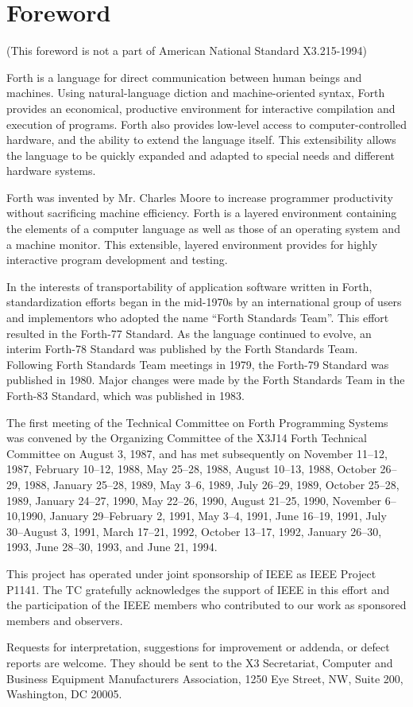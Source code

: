 \chapter*{Foreword }

(This foreword is not a part of American National Standard X3.215-1994)

Forth is a language for direct communication between human beings and
machines. Using natural-language diction and machine-oriented syntax,
Forth provides an economical, productive environment for interactive
compilation and execution of programs. Forth also provides low-level
access to computer-controlled hardware, and the ability to extend the
language itself. This extensibility allows the language to be quickly
expanded and adapted to special needs and different hardware systems.

Forth was invented by Mr. Charles Moore to increase programmer productivity
without sacrificing machine efficiency. Forth is a layered environment
containing the elements of a computer language as well as those of an
operating system and a machine monitor. This extensible, layered environment
provides for highly interactive program development and testing.

In the interests of transportability of application software written in
Forth, standardization efforts began in the mid-1970s by an international
group of users and implementors who adopted the name ``Forth Standards Team''.
This effort resulted in the Forth-77 Standard. As the language continued
to evolve, an interim Forth-78 Standard was published by the Forth Standards
Team. Following Forth Standards Team meetings in 1979, the Forth-79 Standard
was published in 1980. Major changes were made by the Forth Standards Team
in the Forth-83 Standard, which was published in 1983.

The first meeting of the Technical Committee on Forth Programming Systems
was convened by the Organizing Committee of the X3J14 Forth Technical Committee on
August 3, 1987, and has met subsequently on
November 11--12, 1987,
February 10--12, 1988,
May 25--28, 1988,
August 10--13, 1988,
October 26--29, 1988,
January 25--28, 1989,
May 3--6, 1989,
July 26--29, 1989,
October 25--28, 1989,
January 24--27, 1990,
May 22--26, 1990,
August 21--25, 1990,
November 6--10,1990,
January 29--February 2,
1991, May 3--4, 1991,
June 16--19, 1991,
July 30--August 3, 1991,
March 17--21, 1992,
October 13--17, 1992,
January 26--30, 1993,
June 28--30, 1993,
and
June 21, 1994.

This project has operated under joint sponsorship of IEEE as IEEE Project P1141.
The TC gratefully acknowledges the support of IEEE in this effort and the
participation of the IEEE members who contributed to our work as sponsored
members and observers.

Requests for interpretation, suggestions for improvement or addenda, or defect
reports are welcome. They should be sent to the X3 Secretariat, Computer and
Business Equipment Manufacturers Association, 1250 Eye Street, NW, Suite 200,
Washington, DC 20005.
